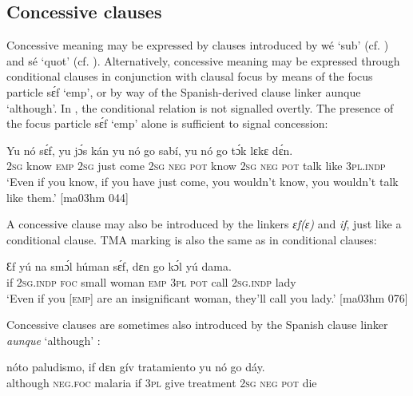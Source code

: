 \subsection{Concessive clauses}\label{sec:10.7.12}

Concessive meaning may be expressed by clauses introduced by wé ‘sub’ (cf. ) and sé ‘quot’ (cf. ). Alternatively, concessive meaning may be expressed through conditional clauses in conjunction with clausal focus by means of the focus particle sɛ́f ‘emp’, or by way of the Spanish-derived clause linker aunque ‘although’. In , the conditional relation is not signalled overtly. The presence of the focus particle sɛ́f ‘emp’ alone is sufficient to signal concession: 


\ea%
    \label{ex:key:1534}
    \gll Yu  nó    sɛ́f,  yu  jɔ́s  kán    yu  nó  go  sabí,
yu  nó  go  tɔ́k  lɛkɛ    dɛ́n.\\
\textsc{2sg}  know  \textsc{emp}  \textsc{2sg}  just  come  \textsc{2sg}  \textsc{neg}  \textsc{pot}  know
\textsc{2sg}  \textsc{neg}  \textsc{pot}  talk  like    \textsc{3pl.indp}\\

\glt ‘Even if you know, if you have just come, you wouldn’t know, 
you wouldn’t talk like them.’ [ma03hm 044]
\z

A concessive clause may also be introduced by the linkers \textit{ɛf(ɛ)} and \textit{if}, just like a conditional clause. TMA marking is also the same as in conditional clauses:


\ea%
    \label{ex:key:1535}
    \gll Ɛf  yú    na  smɔ́l  húman  sɛ́f,   dɛn  go  kɔ́l  yú    dama.\\
if  \textsc{2sg.indp}  \textsc{foc}  small  woman  \textsc{emp}  \textsc{3pl}  \textsc{pot}  call  \textsc{2sg.indp}  lady\\

\glt ‘Even if you [\textsc{emp}] are an insignificant woman, they’ll call you lady.’ [ma03hm 076]
\z

Concessive clauses are sometimes also introduced by the Spanish clause linker \textit{aunque} ‘although’ :


\ea%
    \label{ex:key:1536}
    \gll {}    nóto  paludismo,  if  dɛn  gív  tratamiento  yu  nó  go  dáy.\\
although    \textsc{neg}.\textsc{foc}  malaria    if  \textsc{3pl}  give  treatment  \textsc{2sg}  \textsc{neg}  \textsc{pot}  die\\

